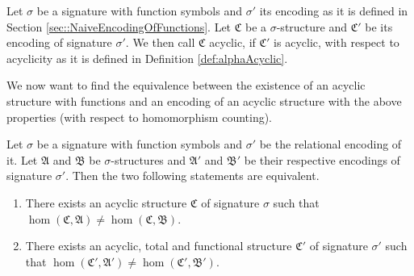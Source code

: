 \begin{definition}
	Let $\sigma$ be a signature with function symbols and $\sigma'$ its encoding as it is defined in Section \ref{sec::NaiveEncodingOfFunctions}.
	Let $\mathfrak C$ be a $\sigma$-structure and $\mathfrak C'$ be its encoding of signature $\sigma'$.
	We then call $\mathfrak C$ acyclic, if $\mathfrak C'$ is acyclic, with respect to acyclicity as it is defined in Definition \ref{def:alphaAcyclic}.
\end{definition}

We now want to find the equivalence between the existence of an acyclic structure with functions and an encoding of an acyclic structure with the above properties (with respect to homomorphism counting).

\begin{lemma}
	Let $\sigma$ be a signature with function symbols and $\sigma'$ be the relational encoding of it.
	Let $\mathfrak A$ and $\mathfrak B$ be $\sigma$-structures and $\mathfrak A'$ and $\mathfrak B'$ be their respective encodings of signature $\sigma'$.
	Then the two following statements are equivalent.
	\begin{enumerate}
		\item There exists an acyclic structure $\mathfrak C$ of signature $\sigma$ such that $\hom(\mathfrak C,\mathfrak A)\neq\hom(\mathfrak C,\mathfrak B)$.
		\item There exists an acyclic, total and functional structure $\mathfrak C'$ of signature $\sigma'$ such that $\hom(\mathfrak C',\mathfrak A')\neq \hom(\mathfrak C',\mathfrak B')$.
	\end{enumerate}
	\label{lem:acycTotalAndFunctionalEquivAcyc}
\end{lemma}
